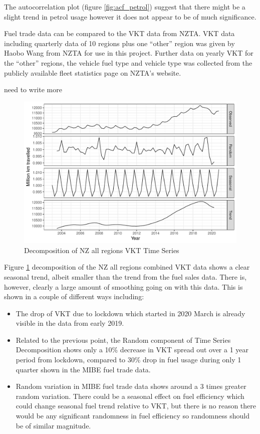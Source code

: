 \documentclass[
]{article}
\begin{document}
The autocorrelation plot (figure \ref{fig:acf_petrol}) suggest that
there might be a slight trend in petrol usage however it does not appear
to be of much significance.

Fuel trade data can be compared to the VKT data from NZTA. VKT data
including quarterly data of 10 regions plus one ``other'' region was
given by Haobo Wang from NZTA for use in this project. Further data on
yearly VKT for the ``other'' regions, the vehicle fuel type and vehicle
type was collected from the publicly available fleet statistics page on
NZTA's website.

need to write more

\begin{figure}
\centering
\includegraphics{final_report_files/figure-latex/VKT_ts-1.pdf}
\caption{Decomposition of NZ all regions VKT Time
Series\label{fig:VKT_ts}}
\end{figure}

Figure \ref{fig:VKT_ts} decomposition of the NZ all regions combined VKT
data shows a clear seasonal trend, albeit smaller than the trend from
the fuel sales data. There is, however, clearly a large amount of
smoothing going on with this data. This is shown in a couple of
different ways including:

\begin{itemize}
\item The drop of VKT due to lockdown which started in 2020 March is already visible in the data from early 2019. 
\item Related to the previous point, the Random component of Time Series Decomposition shows only a 10\% decrease in VKT spread out over a 1 year period from lockdown, compared to 30\% drop in fuel usage during only 1 quarter shown in the MIBE fuel trade data. 
\item Random variation in MIBE fuel trade data shows around a 3 times greater random variation. There could be a seasonal effect on fuel efficiency which could change seasonal fuel trend relative to VKT, but there is no reason there would be any significant randomness in fuel efficiency so randomness should be of similar magnitude.
\end{itemize}
\end{document}
